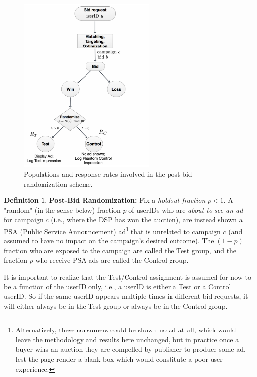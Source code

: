 \documentclass[11pt,a4paper]{article}
\theoremstyle{definition}
\newtheorem{definition}{Definition}[section]
\theoremstyle{remark}
\theoremstyle{definition}
\theoremstyle{definition}
\theoremstyle{definition}
\theoremstyle{definition}
\theoremstyle{definition}
\theoremstyle{definition}
\begin{document}
\begin{figure}\centering
\includegraphics[width = 0.6\textwidth]{post-bid-math.pdf}
\caption{\small Populations and response rates involved in the post-bid randomization scheme.}
\label{fig-post-bid}
\end{figure}

\begin{definition}\small
{\bf Post-Bid Randomization:} Fix a {\em holdout fraction} $p < 1$. 
A "random" (in the sense below) fraction $p$ of userIDs who are {\em about to see an ad} for campaign $c$ (i.e., where the DSP has won the auction), are instead shown a PSA (Public Service Announcement) ad\footnote{Alternatively, these consumers could be shown no ad at all, which would leave the methodology and results here unchanged, but in practice once a buyer wins an auction they are compelled by publisher to produce some ad, lest the page render a blank box which would constitute a poor user experience.} that is unrelated to campaign $c$ (and assumed to have no impact on the campaign's desired outcome). The $(1-p)$ fraction who are exposed to the campaign are called the Test group, and the fraction $p$ who receive PSA ads are called the Control group.
\end{definition}

It is important to realize that the Test/Control assignment is assumed for now to be a function of the userID only, i.e., a userID is either a Test or a Control userID. So if the same userID appears multiple times in different bid requests, it will either always be in the Test group or always be in the Control group. 
\end{document}
